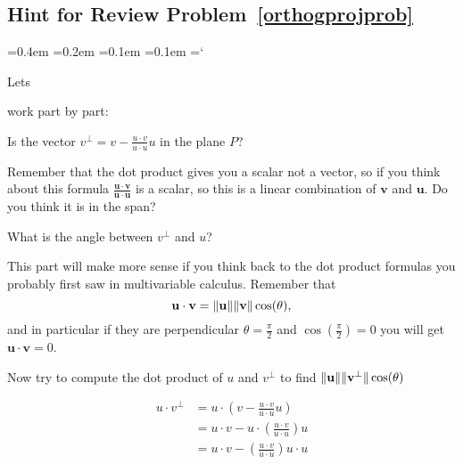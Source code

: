 
\subsection*{Hint  for Review Problem~\ref{orthogprojprob}}

{\ttfamily
{}\font=0.4em
\font=0.2em
\font=0.1em
\font=0.1em
\hyphenchar\font=`\-


\hypertarget{scripts_orthonormal_bases_hint3}{Lets} 
work part by part:
\begin{enumext}[label=\alph*,wrap-label=(#1)]
\item Is the vector $v^\bot = v-\frac{u\cdot v}{u\cdot u}u$ in the plane $P$? 

Remember that the dot product gives you a scalar not a vector, so if you think about this formula $\frac{\mathbf{u}\cdot \mathbf{v}}{\mathbf{u}\cdot \mathbf{u}}$ is a scalar, so this is a linear combination of $\mathbf{v}$ and $\mathbf{u}$. Do you think it is in the span?

\item What is the angle between $v^\bot$ and $u$?

This part will make more sense if you think back to the dot product formulas you probably first saw in multivariable calculus. Remember that 
\[\mathbf{u}\cdot \mathbf{v} = \|\mathbf{u}\| \|\mathbf{v}\| \cos(\theta),
\] 
and in particular if they are perpendicular $\theta = \frac{\pi}{2}$ and $\cos(\frac{\pi}{2}) = 0$ you will get $\mathbf{u}\cdot \mathbf{v} = 0$.

Now try to compute the dot product of $u$ and $v^\bot$ to find $ \|\mathbf{u}\| \|\mathbf{v^\bot}\| \cos(\theta)$

\begin{align*}
u\cdot v^\bot &= u\cdot \left( v  -  \frac{u\cdot v}{u\cdot u}u \right) \\
&= u\cdot  v  - u\cdot \left( \frac{u\cdot v}{u\cdot u} \right)u \\
&= u\cdot  v  - \left( \frac{u\cdot v}{u\cdot u} \right) u\cdot u
\end{align*}


\end{enumext}}

